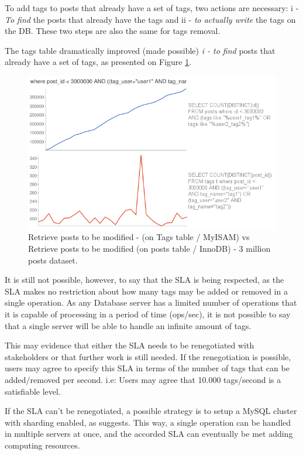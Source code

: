 To add tags to posts that already have a set of tags, two actions are necessary: i - \textit{To find} the posts that already have the tags and ii - \textit{to actually write} the tags on the DB. These two steps are also the same for tags removal.

The tags table dramatically improved (made possible) \textit{i - to find} posts that already have a set of tags, as presented on Figure \ref{fig:tagsVSposts}.

\begin{figure}[ht!]
\centering
\includegraphics[width=120mm]{Imagens/tagsVSposts.png}
\caption{Retrieve posts to be modified -  (on Tags table / MyISAM) vs Retrieve posts to be modified (on posts table / InnoDB) - 3 million posts dataset.\label{fig:tagsVSposts}}
\end{figure}

It is still not possible, however, to say that the SLA is being respected, as the SLA makes no restriction about how many tags may be added or removed in a single operation. As any Database server has a limited number of operations that it is capable of processing in a period of time (ops/sec), it is not possible to say that a single server will be able to handle an infinite amount of tags. 

This may evidence that either the SLA needs to be renegotiated with stakeholders or that further work is still needed. If the renegotiation is possible, users may agree to specify this SLA in terms of the number of tags that can be added/removed per second. i.e: Users may agree that 10.000 tags/second is a satisfiable level. 

If the SLA can't be renegotiated, a possible strategy is to setup a MySQL cluster with sharding enabled, as \cite{mysqlsharding} suggests. This way, a single operation can be handled in multiple servers at once, and the accorded SLA can eventually be met adding computing resources.


